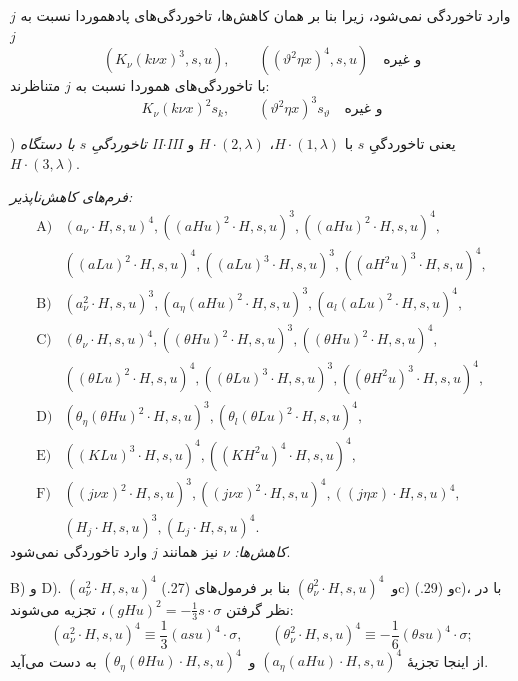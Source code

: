 \documentclass[11pt]{article}
\begin{document}
$j$ وارد تاخوردگی نمی‌شود، زیرا بنا بر همان کاهش‌ها، تاخوردگی‌های پادهموردا نسبت به $j$
\[
(K_\nu(k\nu x)^3,s,u),\qquad ((\vartheta^2\eta x)^4,s,u)\quad\text{و غیره}
\]
با تاخوردگی‌های هموردا نسبت به $j$ متناظرند:
\[
K_\nu(k\nu x)^2s_k,
\qquad (\vartheta^2\eta x)^3s_\vartheta\quad\text{و غیره}
\]

) \emph{تاخوردگیِ $s$ با دستگاه II$\cdot$III}
یعنی تاخوردگیِ $s$ با $H\cdot(1,\lambda)$، $H\cdot(2,\lambda)$ و~$H\cdot(3,\lambda)$.

\noindent\emph{فرم‌های کاهش‌ناپذیر:}
\[
\begin{array}{rl}
\text{A)}&(a_\nu\cdot H,s,u)^4,
((aHu)^2\cdot H,s,u)^3,
((aHu)^2\cdot H,s,u)^4,\\[0.25em]
&((aLu)^2\cdot H,s,u)^4,
((aLu)^3\cdot H,s,u)^3,
((aH^2u)^3\cdot H,s,u)^4,\\[0.45em]
\text{B)}&(a_\nu^2\cdot H,s,u)^3,
(a_\eta(aHu)^2\cdot H,s,u)^3,
(a_l(aLu)^2\cdot H,s,u)^4,\\[0.45em]
\text{C)}&(\theta_\nu\cdot H,s,u)^4,
((\theta Hu)^2\cdot H,s,u)^3,
((\theta Hu)^2\cdot H,s,u)^4,\\[0.25em]
&((\theta Lu)^2\cdot H,s,u)^4,
((\theta Lu)^3\cdot H,s,u)^3,
((\theta H^2u)^3\cdot H,s,u)^4,\\[0.45em]
\text{D)}&(\theta_\eta(\theta Hu)^2\cdot H,s,u)^3,
(\theta_l(\theta Lu)^2\cdot H,s,u)^4,\\[0.45em]
\text{E)}&((KLu)^3\cdot H,s,u)^4,
((KH^2u)^4\cdot H,s,u)^4,\\[0.45em]
\text{F)}&((j\nu x)^2\cdot H,s,u)^3,
((j\nu x)^2\cdot H,s,u)^4,
((j\eta x)\cdot H,s,u)^4,\\[0.25em]
&(H_j\cdot H,s,u)^3,
(L_j\cdot H,s,u)^4.
\end{array}
\]
\noindent\emph{کاهش‌ها:} $\nu$ نیز همانند $j$ وارد تاخوردگی نمی‌شود.

B) و D). $(a_\nu^2\cdot H,s,u)^4$ و~$(\theta_\nu^2\cdot H,s,u)^4$ بنا بر فرمول‌های (27.)c) و (29.)c)، با در نظر گرفتن $(gHu)^2=-\frac13s\cdot\sigma$، تجزیه می‌شوند:
\[
(a_\nu^2\cdot H,s,u)^4\equiv\frac13(asu)^4\cdot\sigma,
\qquad
(\theta_\nu^2\cdot H,s,u)^4\equiv-\frac16(\theta su)^4\cdot\sigma;
\]
از اینجا تجزیهٔ $(a_\eta(aHu)\cdot H,s,u)^4$ و~$(\theta_\eta(\theta Hu)\cdot H,s,u)^4$ به دست می‌آید.
\end{document}
